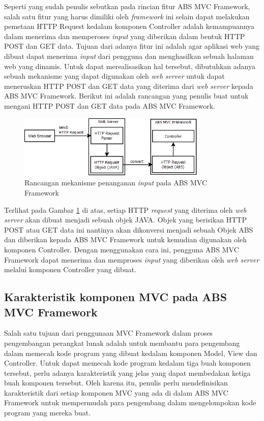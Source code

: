 Seperti yang sudah penulis sebutkan pada rincian fitur ABS MVC Framework, salah satu fitur yang harus dimiliki oleh \textit{framework} ini selain dapat melakukan pemetaan HTTP Request kedalam komponen Controller adalah kemampuannya dalam menerima dan memperoses \textit{input} yang diberikan dalam bentuk HTTP POST dan GET data. Tujuan dari adanya fitur ini adalah agar aplikasi web yang dibuat dapat menerima \textit{input} dari pengguna dan menghasilkan sebuah halaman web yang dinamis. Untuk dapat merealisasikan hal tersebut, dibutuhkan adanya sebuah mekanisme yang dapat digunakan oleh \textit{web server} untuk dapat meneruskan HTTP POST dan GET data yang diterima dari \textit{web server} kepada ABS MVC Framework. Berikut ini adalah rancangan yang penulis buat untuk mengani HTTP POST dan GET data pada ABS MVC Framework.

\begin{figure}
    \centering
    \includegraphics[width=0.8\textwidth]{img/mvc-http-input.png}
    \caption{Rancangan mekanisme penanganan \textit{input} pada ABS MVC Framework}
    \label{fig:mvcHttpInputMechanism}
\end{figure}

Terlihat pada Gambar \ref{fig:mvcHttpInputMechanism} di atas, setiap HTTP \textit{request} yang diterima oleh \textit{web server} akan dibuat menjadi sebuah objek JAVA. Objek yang berisikan HTTP POST atau GET data ini nantinya akan dikonversi menjadi sebuah Objek ABS dan diberikan kepada ABS MVC Framework untuk kemudian digunakan oleh komponen Controller. Dengan menggunakan cara ini, pengguna ABS MVC Framework dapat menerima dan memproses \textit{input} yang diberikan oleh \textit{web server} melalui komponen Controller yang dibuat.

\subsection{Karakteristik komponen MVC pada ABS MVC Framework}

Salah satu tujuan dari penggunaan MVC Framework dalam proses pengembangan perangkat lunak adalah untuk membantu para pengembang dalam memecah kode program yang dibuat kedalam komponen Model, View dan Controller. Untuk dapat memecah kode program kedalam tiga buah komponen tersebut, perlu adanya karakteristik yang jelas yang dapat membedakan ketiga buah komponen tersebut. Oleh karena itu, penulis perlu mendefinisikan karakteristik dari setiap komponen MVC yang ada di dalam ABS MVC Framework untuk mempermudah para pengembang dalam mengelompokan kode program yang mereka buat.\\

